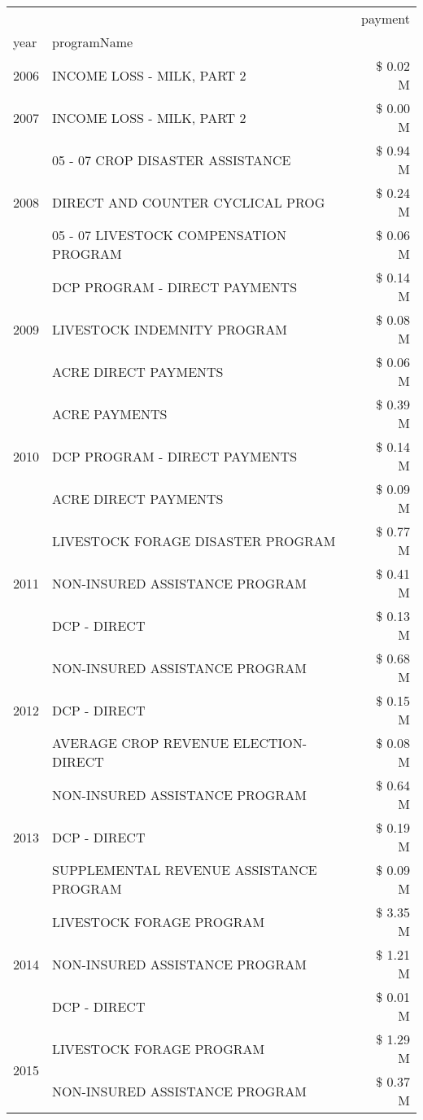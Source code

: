 \begin{tabular}{llr}
\toprule
 &  & payment \\
year & programName &  \\
\midrule
2006 & INCOME LOSS - MILK, PART 2 & \$ 0.02 M \\
\cline{1-3}
2007 & INCOME LOSS - MILK, PART 2 & \$ 0.00 M \\
\cline{1-3}
\multirow[t]{3}{*}{2008} & 05 - 07 CROP DISASTER ASSISTANCE & \$ 0.94 M \\
 & DIRECT AND COUNTER CYCLICAL PROG & \$ 0.24 M \\
 & 05 - 07 LIVESTOCK COMPENSATION PROGRAM & \$ 0.06 M \\
\cline{1-3}
\multirow[t]{3}{*}{2009} & DCP PROGRAM - DIRECT PAYMENTS & \$ 0.14 M \\
 & LIVESTOCK INDEMNITY PROGRAM & \$ 0.08 M \\
 & ACRE DIRECT PAYMENTS & \$ 0.06 M \\
\cline{1-3}
\multirow[t]{3}{*}{2010} & ACRE PAYMENTS & \$ 0.39 M \\
 & DCP PROGRAM - DIRECT PAYMENTS & \$ 0.14 M \\
 & ACRE DIRECT PAYMENTS & \$ 0.09 M \\
\cline{1-3}
\multirow[t]{3}{*}{2011} & LIVESTOCK FORAGE DISASTER PROGRAM & \$ 0.77 M \\
 & NON-INSURED ASSISTANCE PROGRAM & \$ 0.41 M \\
 & DCP - DIRECT & \$ 0.13 M \\
\cline{1-3}
\multirow[t]{3}{*}{2012} & NON-INSURED ASSISTANCE PROGRAM & \$ 0.68 M \\
 & DCP - DIRECT & \$ 0.15 M \\
 & AVERAGE CROP REVENUE ELECTION-DIRECT & \$ 0.08 M \\
\cline{1-3}
\multirow[t]{3}{*}{2013} & NON-INSURED ASSISTANCE PROGRAM & \$ 0.64 M \\
 & DCP - DIRECT & \$ 0.19 M \\
 & SUPPLEMENTAL REVENUE ASSISTANCE PROGRAM & \$ 0.09 M \\
\cline{1-3}
\multirow[t]{3}{*}{2014} & LIVESTOCK FORAGE PROGRAM & \$ 3.35 M \\
 & NON-INSURED ASSISTANCE PROGRAM & \$ 1.21 M \\
 & DCP - DIRECT & \$ 0.01 M \\
\cline{1-3}
\multirow[t]{3}{*}{2015} & LIVESTOCK FORAGE PROGRAM & \$ 1.29 M \\
 & NON-INSURED ASSISTANCE PROGRAM & \$ 0.37 M \\

\end{tabular}

